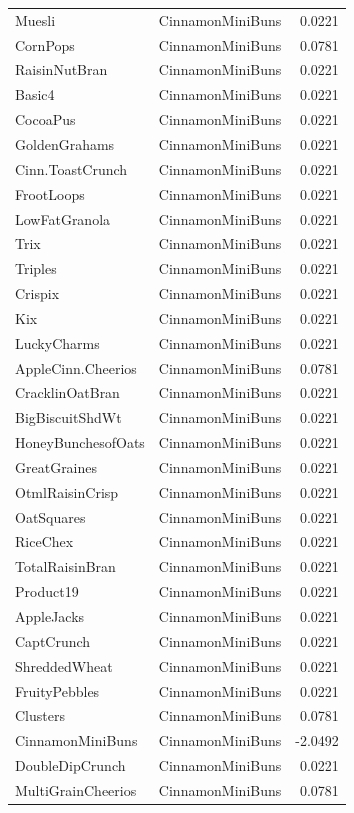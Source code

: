 \begin{longtable}{llr}
Muesli & CinnamonMiniBuns & 0.0221 \\
CornPops & CinnamonMiniBuns & 0.0781 \\
RaisinNutBran & CinnamonMiniBuns & 0.0221 \\
Basic4 & CinnamonMiniBuns & 0.0221 \\
CocoaPus & CinnamonMiniBuns & 0.0221 \\
GoldenGrahams & CinnamonMiniBuns & 0.0221 \\
Cinn.ToastCrunch & CinnamonMiniBuns & 0.0221 \\
FrootLoops & CinnamonMiniBuns & 0.0221 \\
LowFatGranola & CinnamonMiniBuns & 0.0221 \\
Trix & CinnamonMiniBuns & 0.0221 \\
Triples & CinnamonMiniBuns & 0.0221 \\
Crispix & CinnamonMiniBuns & 0.0221 \\
Kix & CinnamonMiniBuns & 0.0221 \\
LuckyCharms & CinnamonMiniBuns & 0.0221 \\
AppleCinn.Cheerios & CinnamonMiniBuns & 0.0781 \\
CracklinOatBran & CinnamonMiniBuns & 0.0221 \\
BigBiscuitShdWt & CinnamonMiniBuns & 0.0221 \\
HoneyBunchesofOats & CinnamonMiniBuns & 0.0221 \\
GreatGraines & CinnamonMiniBuns & 0.0221 \\
OtmlRaisinCrisp & CinnamonMiniBuns & 0.0221 \\
OatSquares & CinnamonMiniBuns & 0.0221 \\
RiceChex & CinnamonMiniBuns & 0.0221 \\
TotalRaisinBran & CinnamonMiniBuns & 0.0221 \\
Product19 & CinnamonMiniBuns & 0.0221 \\
AppleJacks & CinnamonMiniBuns & 0.0221 \\
CaptCrunch & CinnamonMiniBuns & 0.0221 \\
ShreddedWheat & CinnamonMiniBuns & 0.0221 \\
FruityPebbles & CinnamonMiniBuns & 0.0221 \\
Clusters & CinnamonMiniBuns & 0.0781 \\
CinnamonMiniBuns & CinnamonMiniBuns & -2.0492 \\
DoubleDipCrunch & CinnamonMiniBuns & 0.0221 \\
MultiGrainCheerios & CinnamonMiniBuns & 0.0781 \\

\end{longtable}
